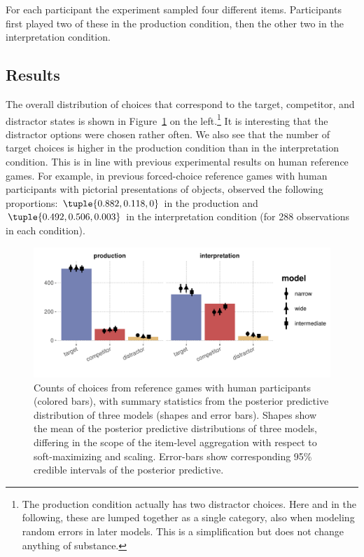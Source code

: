 \documentclass{article}
\begin{document}
For each participant the experiment sampled four different items.
Participants first played two of these in the production condition, then the other two in the interpretation condition.


\subsection{Results}\label{results}

The overall distribution of choices that correspond to the target, competitor, and distractor states is shown in Figure~\ref{fig:refgame-counts} on the left.\footnote{
  The production condition actually has two distractor choices.
  Here and in the following, these are lumped together as a single category, also when modeling random errors in later models.
  This is a simplification but does not change anything of substance.}
It is interesting that the distractor options were chosen rather often.
We also see that the number of target choices is higher in the production condition than in the interpretation condition.
This is in line with previous experimental results on human reference games.
For example, in previous forced-choice reference games with human participants with pictorial presentations of objects, \citet{QingFranke2013:Variations-on-a} observed the following proportions: $\tuple{0.882, 0.118, 0}$ in the production and $\tuple{0.492, 0.506, 0.003}$ in the interpretation condition (for 288 observations in each condition).

\begin{figure}
  \centering

    \includegraphics[width=0.9\linewidth]{00-pics/PPC-alpha-eps-model.pdf}

    \caption{Counts of choices from reference games with human participants (colored bars), with summary statistics from the posterior predictive distribution of three models (shapes and error bars).
      Shapes show the mean of the posterior predictive distributions of three models, differing in the scope of the item-level aggregation with respect to soft-maximizing and scaling.
      Error-bars show corresponding 95\% credible intervals of the posterior predictive.
    }
  \label{fig:refgame-counts}
\end{figure}
\end{document}
